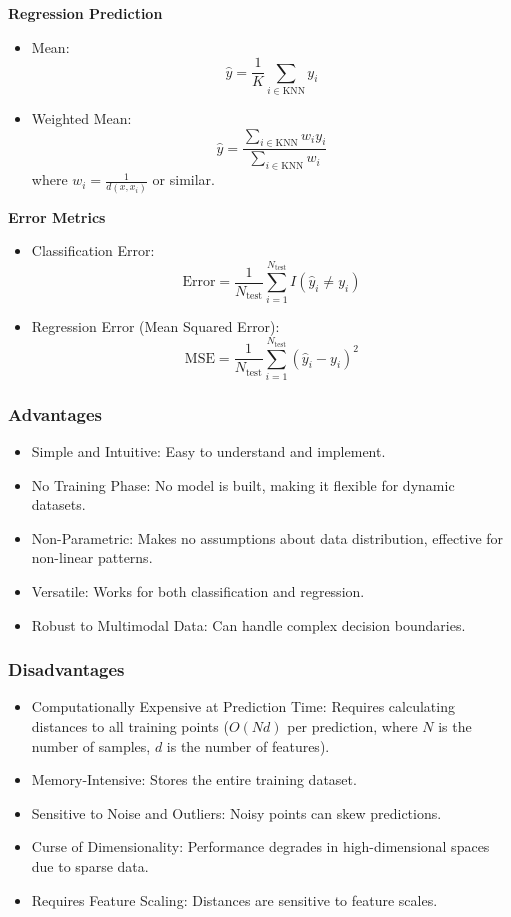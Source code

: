 \smallskip
\textbf{Regression Prediction}

\begin{itemize}
    \item Mean:
    \[\hat{y} = \frac{1}{K} \sum_{i \in \text{KNN}} y_i\]

    \item Weighted Mean:
    \[\hat{y} = \frac{\sum_{i \in \text{KNN}} w_i y_i}{\sum_{i \in \text{KNN}} w_i}\]
    where $w_i = \frac{1}{d(x, x_i)}$ or similar.
\end{itemize}

\smallskip
\textbf{Error Metrics}
\begin{itemize}
    \item Classification Error:
    \[\text{Error} = \frac{1}{N_{\text{test}}} \sum_{i=1}^{N_{\text{test}}} I(\hat{y}_i \neq y_i)\]

    \item Regression Error (Mean Squared Error):
    \[\text{MSE} = \frac{1}{N_{\text{test}}} \sum_{i=1}^{N_{\text{test}}} (\hat{y}_i - y_i)^2\]
\end{itemize}

\subsubsection{Advantages}

\begin{itemize}
    \item Simple and Intuitive: Easy to understand and implement.
    \item No Training Phase: No model is built, making it flexible for dynamic datasets.
    \item Non-Parametric: Makes no assumptions about data distribution, effective for non-linear patterns.
    \item Versatile: Works for both classification and regression.
    \item Robust to Multimodal Data: Can handle complex decision boundaries.
\end{itemize}

\subsubsection{Disadvantages}
\begin{itemize}
    \item Computationally Expensive at Prediction Time: Requires calculating distances to all training points ($O(Nd)$ per prediction, where $N$ is the number of samples, $d$ is the number of features).
    \item Memory-Intensive: Stores the entire training dataset.
    \item Sensitive to Noise and Outliers: Noisy points can skew predictions.
    \item Curse of Dimensionality: Performance degrades in high-dimensional spaces due to sparse data.
    \item Requires Feature Scaling: Distances are sensitive to feature scales.
\end{itemize}